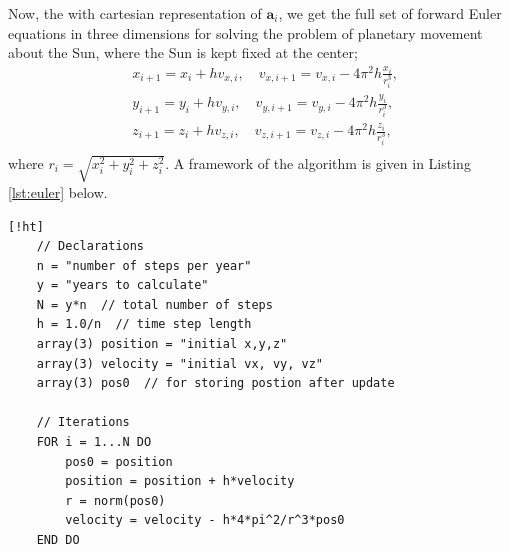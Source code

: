 \documentclass[]{article}
\begin{document}
Now, the with cartesian representation of $\mathbf{a}_i$, we get the full set of forward Euler equations in three dimensions for solving the problem of planetary movement about the Sun, where the Sun is kept fixed at the center;
\begin{equation} \label{euler-fwd}
\begin{aligned}
	&x_{i+1} = x_i + hv_{x,i} ,\quad v_{x,i+1} = v_{x,i} - 4\pi^2h\frac{x_i}{r_i^3} ,\\
	&y_{i+1} = y_i + hv_{y,i} ,\quad v_{y,i+1} = v_{y,i} - 4\pi^2h\frac{y_i}{r_i^3} ,\\
	&z_{i+1} = z_i + hv_{z,i} ,\quad v_{z,i+1} = v_{z,i} - 4\pi^2h\frac{z_i}{r_i^3} ,\\
\end{aligned}
\end{equation}
where $r_i = \sqrt{x_i^2 + y_i^2 + z_i^2}$. A framework of the algorithm is given in Listing \ref{lst:euler} below.

\begin{lstlisting}[caption={Euler's Forward algorithm for Sun-Earth system with fixed Sun.},label={lst:euler}] [!ht]
	// Declarations
	n = "number of steps per year"
	y = "years to calculate"
	N = y*n  // total number of steps
	h = 1.0/n  // time step length
	array(3) position = "initial x,y,z"
	array(3) velocity = "initial vx, vy, vz"
	array(3) pos0  // for storing postion after update
	
	// Iterations
	FOR i = 1...N DO
		pos0 = position
		position = position + h*velocity
		r = norm(pos0)
		velocity = velocity - h*4*pi^2/r^3*pos0
	END DO
\end{lstlisting}
\end{document}
